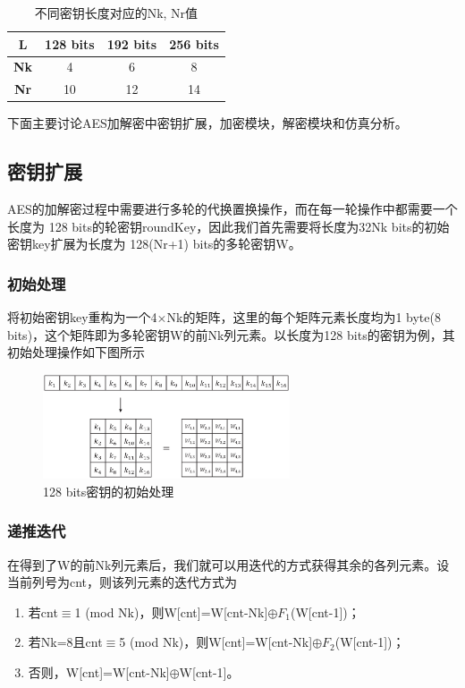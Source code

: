 \begin{table}[h]
    \centering
    \begin{tabular}{|c|c|c|c|}
        \hline
        \textbf{L} & 128 bits & 192 bits & 256 bits \\
        \hline
        \textbf{Nk} & 4 & 6 & 8 \\
        \hline
        \textbf{Nr} & 10 & 12 & 14 \\
        \hline
    \end{tabular}
    \caption{不同密钥长度对应的Nk, Nr值}
\end{table}

下面主要讨论AES加解密中密钥扩展，加密模块，解密模块和仿真分析。

\subsection{密钥扩展}

AES的加解密过程中需要进行多轮的代换置换操作，而在每一轮操作中都需要一个长度为 128 bits的轮密钥roundKey，因此我们首先需要将长度为32Nk bits的初始密钥key扩展为长度为 128(Nr+1) bits的多轮密钥W。

\subsubsection{初始处理}

将初始密钥key重构为一个4$\times$Nk的矩阵，这里的每个矩阵元素长度均为1 byte(8 bits)，这个矩阵即为多轮密钥W的前Nk列元素。以长度为128 bits的密钥为例，其初始处理操作如下图所示

\begin{figure}[h]
    \centering
    \includegraphics[width=0.65\textwidth]{./pic/keyExpansion_1.eps}
    \caption{128 bits密钥的初始处理}
\end{figure}

\subsubsection{递推迭代}

在得到了W的前Nk列元素后，我们就可以用迭代的方式获得其余的各列元素。设当前列号为cnt，则该列元素的迭代方式为
\begin{enumerate}
    \item 若cnt$\equiv$1 (mod Nk)，则W[cnt]=W[cnt-Nk]$\oplus F_1$(W[cnt-1])；
    \item 若Nk=8且cnt$\equiv$5 (mod Nk)，则W[cnt]=W[cnt-Nk]$\oplus F_2$(W[cnt-1])；
    \item 否则，W[cnt]=W[cnt-Nk]$\oplus$W[cnt-1]。
\end{enumerate}

